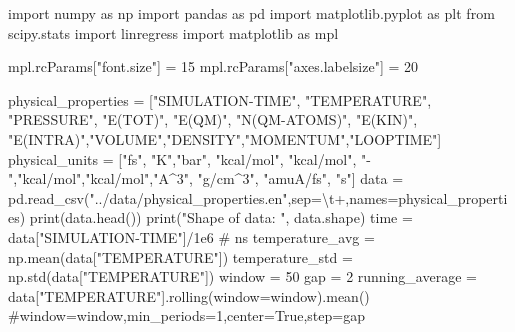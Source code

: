 \documentclass[
  letterpaper,
]{article}
\newenvironment{Shaded}{\begin{snugshade}}{\end{snugshade}}
\newcommand{\BuiltInTok}[1]{\textcolor[rgb]{0.00,0.23,0.31}{#1}}
\newcommand{\CharTok}[1]{\textcolor[rgb]{0.13,0.47,0.30}{#1}}
\newcommand{\CommentTok}[1]{\textcolor[rgb]{0.37,0.37,0.37}{#1}}
\newcommand{\DecValTok}[1]{\textcolor[rgb]{0.68,0.00,0.00}{#1}}
\newcommand{\FloatTok}[1]{\textcolor[rgb]{0.68,0.00,0.00}{#1}}
\newcommand{\ImportTok}[1]{\textcolor[rgb]{0.00,0.46,0.62}{#1}}
\newcommand{\NormalTok}[1]{\textcolor[rgb]{0.00,0.23,0.31}{#1}}
\newcommand{\OperatorTok}[1]{\textcolor[rgb]{0.37,0.37,0.37}{#1}}
\newcommand{\StringTok}[1]{\textcolor[rgb]{0.13,0.47,0.30}{#1}}
\begin{document}
\begin{Shaded}
\begin{Highlighting}[]
\ImportTok{import}\NormalTok{ numpy }\ImportTok{as}\NormalTok{ np}
\ImportTok{import}\NormalTok{ pandas }\ImportTok{as}\NormalTok{ pd}
\ImportTok{import}\NormalTok{ matplotlib.pyplot }\ImportTok{as}\NormalTok{ plt}
\ImportTok{from}\NormalTok{ scipy.stats }\ImportTok{import}\NormalTok{ linregress}
\ImportTok{import}\NormalTok{ matplotlib }\ImportTok{as}\NormalTok{ mpl}

\NormalTok{mpl.rcParams[}\StringTok{"font.size"}\NormalTok{] }\OperatorTok{=} \DecValTok{15}
\NormalTok{mpl.rcParams[}\StringTok{"axes.labelsize"}\NormalTok{] }\OperatorTok{=} \DecValTok{20}


\NormalTok{physical\_properties }\OperatorTok{=}\NormalTok{ [}\StringTok{"SIMULATION{-}TIME"}\NormalTok{, }\StringTok{"TEMPERATURE"}\NormalTok{, }\StringTok{"PRESSURE"}\NormalTok{, }\StringTok{"E(TOT)"}\NormalTok{, }\StringTok{"E(QM)"}\NormalTok{, }\StringTok{"N(QM{-}ATOMS)"}\NormalTok{, }\StringTok{"E(KIN)"}\NormalTok{, }\StringTok{"E(INTRA)"}\NormalTok{,}\StringTok{"VOLUME"}\NormalTok{,}\StringTok{"DENSITY"}\NormalTok{,}\StringTok{"MOMENTUM"}\NormalTok{,}\StringTok{"LOOPTIME"}\NormalTok{]}
\NormalTok{physical\_units }\OperatorTok{=}\NormalTok{ [}\StringTok{"fs"}\NormalTok{, }\StringTok{"K"}\NormalTok{,}\StringTok{"bar"}\NormalTok{, }\StringTok{"kcal/mol"}\NormalTok{, }\StringTok{"kcal/mol"}\NormalTok{, }\StringTok{"{-}"}\NormalTok{,}\StringTok{"kcal/mol"}\NormalTok{,}\StringTok{"kcal/mol"}\NormalTok{,}\StringTok{"A\^{}3"}\NormalTok{, }\StringTok{"g/cm\^{}3"}\NormalTok{, }\StringTok{"amuA/fs"}\NormalTok{, }\StringTok{"s"}\NormalTok{]}
\NormalTok{data }\OperatorTok{=}\NormalTok{ pd.read\_csv(}\StringTok{"../data/physical\_properties.en"}\NormalTok{,sep}\OperatorTok{=}\StringTok{\textquotesingle{}}\CharTok{\textbackslash{}t}\StringTok{+\textquotesingle{}}\NormalTok{,names}\OperatorTok{=}\NormalTok{physical\_properties)}
\BuiltInTok{print}\NormalTok{(data.head())}
\BuiltInTok{print}\NormalTok{(}\StringTok{"Shape of data: "}\NormalTok{, data.shape)}
\NormalTok{time }\OperatorTok{=}\NormalTok{ data[}\StringTok{"SIMULATION{-}TIME"}\NormalTok{]}\OperatorTok{/}\FloatTok{1e6} \CommentTok{\# ns}
\NormalTok{temperature\_avg }\OperatorTok{=}\NormalTok{ np.mean(data[}\StringTok{"TEMPERATURE"}\NormalTok{])}
\NormalTok{temperature\_std }\OperatorTok{=}\NormalTok{ np.std(data[}\StringTok{"TEMPERATURE"}\NormalTok{])}
\NormalTok{window }\OperatorTok{=} \DecValTok{50}
\NormalTok{gap }\OperatorTok{=} \DecValTok{2}
\NormalTok{running\_average }\OperatorTok{=}\NormalTok{ data[}\StringTok{"TEMPERATURE"}\NormalTok{].rolling(window}\OperatorTok{=}\NormalTok{window).mean() }\CommentTok{\#window=window,min\_periods=1,center=True,step=gap}


\end{Highlighting}
\end{Shaded}
\end{document}

